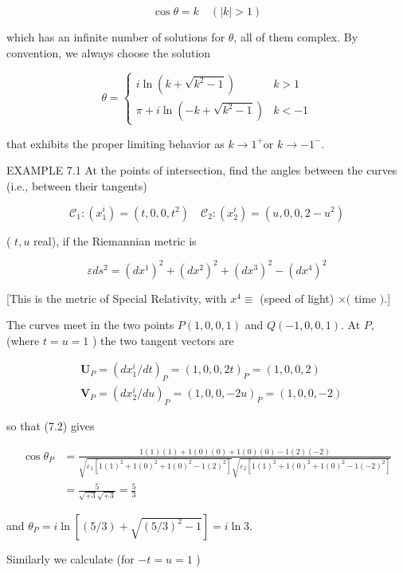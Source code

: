 \documentclass[10pt]{article}
\begin{document}
$$
\cos \theta=k \quad(|k|>1)
$$

which has an infinite number of solutions for $\theta$, all of them complex. By convention, we always choose the solution

$$
\theta= \begin{cases}i \ln \left(k+\sqrt{k^{2}-1}\right) & k>1 \\ \pi+i \ln \left(-k+\sqrt{k^{2}-1}\right) & k<-1\end{cases}
$$

that exhibits the proper limiting behavior as $k \rightarrow 1^{+}$or $k \rightarrow-1^{-}$.

EXAMPLE 7.1 At the points of intersection, find the angles between the curves (i.e., between their tangents)

$$
\mathscr{C}_{1}:\left(x_{1}^{i}\right)=\left(t, 0,0, t^{2}\right) \quad \mathscr{C}_{2}:\left(x_{2}^{i}\right)=\left(u, 0,0,2-u^{2}\right)
$$

( $t, u$ real), if the Riemannian metric is

$$
\varepsilon d s^{2}=\left(d x^{1}\right)^{2}+\left(d x^{2}\right)^{2}+\left(d x^{3}\right)^{2}-\left(d x^{4}\right)^{2}
$$

[This is the metric of Special Relativity, with $x^{4} \equiv$ (speed of light) $\times($ time $)$.]

The curves meet in the two points $P(1,0,0,1)$ and $Q(-1,0,0,1)$. At $P$, (where $t=u=1$ ) the two tangent vectors are

$$
\begin{aligned}
& \mathbf{U}_{P}=\left(d x_{1}^{i} / d t\right)_{P}=(1,0,0,2 t)_{P}=(1,0,0,2) \\
& \mathbf{V}_{P}=\left(d x_{2}^{i} / d u\right)_{P}=(1,0,0,-2 u)_{P}=(1,0,0,-2)
\end{aligned}
$$

so that (7.2) gives

$$
\begin{aligned}
\cos \theta_{P} & =\frac{1(1)(1)+1(0)(0)+1(0)(0)-1(2)(-2)}{\sqrt{\varepsilon_{1}\left[1(1)^{2}+1(0)^{2}+1(0)^{2}-1(2)^{2}\right]} \sqrt{\varepsilon_{2}\left[1(1)^{2}+1(0)^{2}+1(0)^{2}-1(-2)^{2}\right]}} \\
& =\frac{5}{\sqrt{+3} \sqrt{+3}}=\frac{5}{3}
\end{aligned}
$$

and $\theta_{P}=i \ln \left[(5 / 3)+\sqrt{(5 / 3)^{2}-1}\right]=i \ln 3$.

Similarly we calculate (for $-t=u=1$ )
\end{document}
